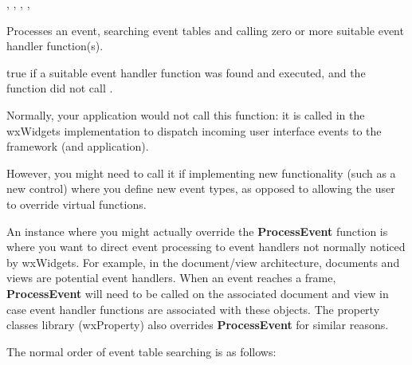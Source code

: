 
,\rtfsp
{},\rtfsp
{},\rtfsp
{},\rtfsp
{}

\label{wxevthandlerprocessevent}


Processes an event, searching event tables and calling zero or more suitable event handler function(s).




true if a suitable event handler function was found and executed, and the function did not
call .


Normally, your application would not call this function: it is called in the wxWidgets
implementation to dispatch incoming user interface events to the framework (and application).

However, you might need to call it if implementing new functionality (such as a new control) where
you define new event types, as opposed to allowing the user to override virtual functions.

An instance where you might actually override the {\bf ProcessEvent} function is where you want
to direct event processing to event handlers not normally noticed by wxWidgets. For example,
in the document/view architecture, documents and views are potential event handlers.
When an event reaches a frame, {\bf ProcessEvent} will need to be called on the associated
document and view in case event handler functions are associated with these objects.
The property classes library (wxProperty) also overrides {\bf ProcessEvent} for similar reasons.

The normal order of event table searching is as follows:

